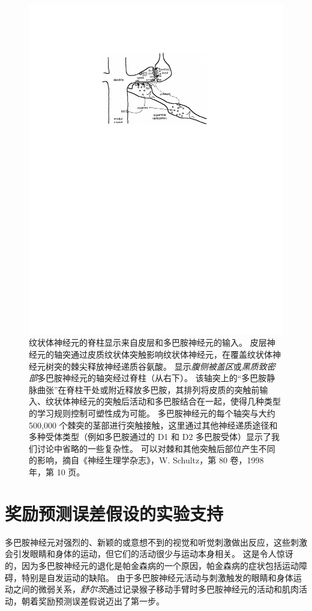 \begin{figure}[!htb]
	\centering
	\includegraphics[width=0.7\linewidth]{chap12/fig_12_2}
	\caption{纹状体神经元的脊柱显示来自皮层和多巴胺神经元的输入。
		皮层神经元的轴突通过皮质纹状体突触影响纹状体神经元，在覆盖纹状体神经元树突的棘尖释放神经递质谷氨酸。
		显示\textit{腹侧被盖区}或\textit{黑质致密部}多巴胺神经元的轴突经过脊柱（从右下）。
		该轴突上的“多巴胺静脉曲张”在脊柱干处或附近释放多巴胺，其排列将皮质的突触前输入、纹状体神经元的突触后活动和多巴胺结合在一起，使得几种类型的学习规则控制可塑性成为可能。
		多巴胺神经元的每个轴突与大约 500,000 个棘突的茎部进行突触接触，这里通过其他神经递质途径和多种受体类型（例如多巴胺通过的 D1 和 D2 多巴胺受体）显示了我们讨论中省略的一些复杂性。
		可以对棘和其他突触后部位产生不同的影响，摘自《神经生理学杂志》，W. Schultz，第 80 卷，1998 年，第 10 页。
		\label{fig:12_2}}
\end{figure}



\section{奖励预测误差假设的实验支持} \label{sec:experimental_support}

多巴胺神经元对强烈的、新颖的或意想不到的视觉和听觉刺激做出反应，这些刺激会引发眼睛和身体的运动，但它们的活动很少与运动本身相关。
这是令人惊讶的，因为多巴胺神经元的退化是帕金森病的一个原因，帕金森病的症状包括运动障碍，特别是自发运动的缺陷。
由于多巴胺神经元活动与刺激触发的眼睛和身体运动之间的微弱关系，\textit{舒尔茨}\cite{romo1990dopamine,schultz1990dopamine}通过记录猴子移动手臂时多巴胺神经元的活动和肌肉活动，朝着奖励预测误差假说迈出了第一步。


